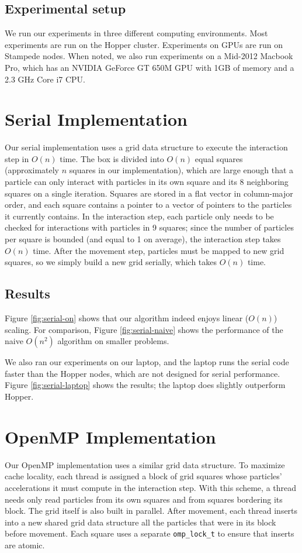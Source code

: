 \documentclass{article}
\newcommand{\code}[1]%
  {\texttt{#1}}
\begin{document}
\subsection{Experimental setup}
We run our experiments in three different computing environments.  Most experiments are run on the Hopper cluster.  Experiments on GPUs are run on Stampede nodes.  When noted, we also run experiments on a Mid-2012 Macbook Pro, which has an NVIDIA GeForce GT 650M GPU with 1GB of memory and a 2.3 GHz Core i7 CPU.

\section{Serial Implementation}
Our serial implementation uses a grid data structure to execute the interaction step in $O(n)$ time.  The box is divided into $O(n)$ equal squares (approximately $n$ squares in our implementation), which are large enough that a particle can only interact with particles in its own square and its 8 neighboring squares on a single iteration.  Squares are stored in a flat vector in column-major order, and each square contains a pointer to a vector of pointers to the particles it currently contains.  In the interaction step, each particle only needs to be checked for interactions with particles in 9 squares; since the number of particles per square is bounded (and equal to 1 on average), the interaction step takes $O(n)$ time.  After the movement step, particles must be mapped to new grid squares, so we simply build a new grid serially, which takes $O(n)$ time.

\subsection{Results}
Figure \ref{fig:serial-on} shows that our algorithm indeed enjoys linear ($O(n)$) scaling.  For comparison, Figure \ref{fig:serial-naive} shows the performance of the naive $O(n^2)$ algorithm on smaller problems.

We also ran our experiments on our laptop, and the laptop runs the serial code faster than the Hopper nodes, which are not designed for serial performance.  Figure \ref{fig:serial-laptop} shows the results; the laptop does slightly outperform Hopper.

\section{OpenMP Implementation}
Our OpenMP implementation uses a similar grid data structure.  To maximize cache locality, each thread is assigned a block of grid squares whose particles' accelerations it must compute in the interaction step.  With this scheme, a thread needs only read particles from its own squares and from squares bordering its block.  The grid itself is also built in parallel.  After movement, each thread inserts into a new shared grid data structure all the particles that were in its block before movement.  Each square uses a separate \code{omp\_lock\_t} to ensure that inserts are atomic.
\end{document}

